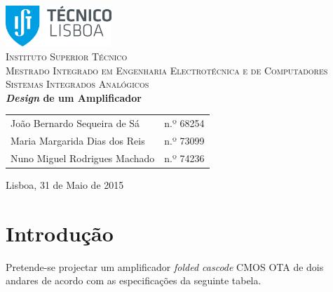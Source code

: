 \documentclass[11pt]{article}
\numberwithin{equation}{section}
\begin{document}
\begin{titlepage}
\begin{center}

\hfill \break
\hfill \break

\includegraphics[width=0.3\textwidth]{./logo}~\\[1cm]

\textsc{\LARGE Instituto Superior Técnico}\\[0.25cm]
\textsc{\Large Mestrado Integrado em Engenharia Electrotécnica e de Computadores}\\[1.8cm]
\textsc{\huge Sistemas Integrados Analógicos}\\[0.25cm]

{\huge \bfseries \textit{Design} de um Amplificador \\[1cm]}

\begin{tabular}{ l l }
João Bernardo Sequeira de Sá & \hspace{2mm} n.º 68254 \\
Maria Margarida Dias dos Reis & \hspace{2mm} n.º 73099 \\
Nuno Miguel Rodrigues Machado & \hspace{2mm} n.º 74236
\end{tabular}

\vfill

{\large Lisboa, 31 de Maio de 2015} 

\end{center}
\end{titlepage}

\clearpage

\tableofcontents
\pagebreak

\clearpage
{}

\section{Introdução}

Pretende-se projectar um amplificador \textit{folded cascode} CMOS OTA de dois andares de acordo com as especificações da seguinte tabela.
\end{document}
